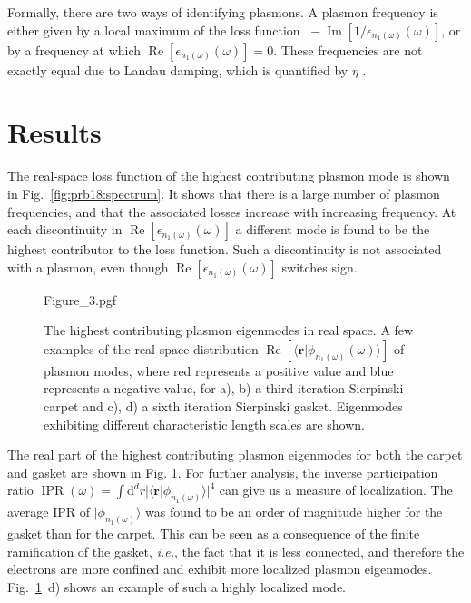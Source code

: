 Formally, there are two ways of identifying plasmons. A plasmon frequency is either given by a local maximum of the loss function $\;-\operatorname{Im}[1/\epsilon_{n_1(\omega)}(\omega)]$, or by a frequency at which $\operatorname{Re}[\epsilon_{n_1(\omega)}(\omega)] = 0$. These frequencies are not exactly equal due to Landau damping, which is quantified by $\eta$ \cite{andersen2012spatially}.

\section{Results}

The real-space loss function of the highest contributing plasmon mode is shown in Fig.~\ref{fig:prb18:spectrum}. It shows that there is a large number of plasmon frequencies, and that the associated losses increase with increasing frequency. At each discontinuity in $\operatorname{Re}[\epsilon_{n_1(\omega)}(\omega)]$ a different mode is found to be the highest contributor to the loss function. Such a discontinuity is not associated with a plasmon, even though $\operatorname{Re}[\epsilon_{n_1(\omega)}(\omega)]$ switches sign.

\begin{figure}[h]
    \centering
    {Figure_3.pgf}
    \caption{The highest contributing plasmon eigenmodes in real space. A few examples of the real space distribution $\operatorname{Re}[\langle\mathbf{r}| \phi_{n_1(\omega)}(\omega)\rangle]$ of plasmon modes, where red represents a positive value and blue represents a negative value, for a), b) a third iteration Sierpinski carpet and c), d) a sixth iteration Sierpinski gasket. Eigenmodes exhibiting different characteristic length scales are shown.}
    \label{fig:prb18:eigenstates}
\end{figure}

The real part of the highest contributing plasmon eigenmodes for both the carpet and gasket are shown in Fig. \ref{fig:prb18:eigenstates}. For further analysis, the inverse participation ratio $\operatorname{IPR}(\omega) = \int\!\!\text{d}^d r |\langle \mathbf{r}|\phi_{n_1(\omega)} \rangle|^4$ can give us a measure of localization. The average IPR of $|\phi_{n_1(\omega)}\rangle$ was found to be an order of magnitude higher for the gasket than for the carpet. This can be seen as a consequence of the finite ramification of the gasket, \textit{i.e.}, the fact that it is less connected, and therefore the electrons are more confined and exhibit more localized plasmon eigenmodes. Fig.~\ref{fig:prb18:eigenstates}~d) shows an example of such a highly localized mode.

